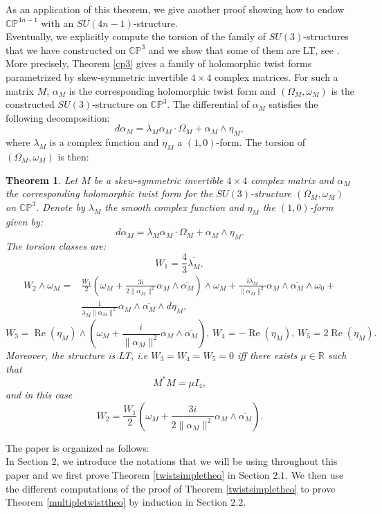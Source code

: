 \documentclass[12pt, reqno]{amsart}
\newtheorem{introthm}{Theorem}
\DeclareMathOperator\Ree{Re}
\newcommand{\R}{\mathbb{R}}
\newcommand{\C}{\mathbb{C}}
\newcommand{\p}{\mathbb{P}}
\begin{document}
As an application of this theorem, we give another proof showing how to endow $\C\p^{4n-1}$ with an $SU(4n-1)$-structure.\\
\indent Eventually, we explicitly compute the torsion of the family of $SU(3)$-structures that we have constructed on $\C\p^3$ and we show that some of them are LT, see \cite{Larfors_2013,Larfors_2010}. More precisely, Theorem \ref{cp3} gives a family of holomorphic twist forms parametrized by skew-symmetric invertible $4\times 4$ complex matrices. For such a matrix $M$, $\alpha_M$ is the corresponding holomorphic twist form and $(\Omega_M,\omega_M)$ is the constructed $SU(3)$-structure on $\C\p^3$. The differential of $\alpha_M$ satisfies the following decomposition: \[d\alpha_M=\lambda_M\alpha_M\cdot\Omega_M+\alpha_M\wedge\eta_M,\] 
where $\lambda_M$ is a complex function and $\eta_M$ a $(1,0)$-form. The torsion of $(\Omega_M,\omega_M)$ is then: 
\begin{introthm}\label{torsion}
    Let $M$ be a skew-symmetric invertible $4\times 4$ complex matrix and $\alpha_M$ the corresponding holomorphic twist form for the $SU(3)$-structure $(\Omega_M,\omega_M)$ on $\C\p^3$. Denote by $\lambda_M$ the smooth complex function and $\eta_M$ the $(1,0)$-form given by: \[d\alpha_M=\lambda_M\alpha_M\cdot\Omega_M+\alpha_M\wedge\eta_M.\] The torsion classes are:
    \[W_1=\frac{4}{3}\overline{\lambda_M},\]
    \begin{align*}W_2\wedge\omega_M=&\frac{W_1}{2}(\omega_M+\frac{3i}{2\|\alpha_M\|^2}\alpha_M\wedge\overline{\alpha_M})\wedge\omega_M+\frac{i\overline{\lambda_M}}{\|\alpha_M\|^2}\alpha_M\wedge\overline{\alpha_M}\wedge\omega_0+\\&\frac{1}{\lambda_M\|\alpha_M\|^2}\alpha_M\wedge\overline{\alpha_M}\wedge d\eta_M,\end{align*} 
    \[W_3=\Ree(\eta_M)\wedge(\omega_M+\frac{i}{\|\alpha_M\|^2}\alpha_M\wedge\overline{\alpha_M}),\, W_4=-\Ree(\eta_M),\, W_5=2\Ree(\eta_M).\] Moreover, the structure is LT, i.e $W_3=W_4=W_5=0$ iff there exists $\mu\in\R$ such that \[M^*M=\mu I_4,\] and in this case \[W_2=\frac{W_1}{2}(\omega_M+\frac{3i}{2\|\alpha_M\|^2}\alpha_M\wedge\overline{\alpha_M}).\] 
\end{introthm}
The paper is organized as follows: \\
\indent In Section $2$, we introduce the notations that we will be using throughout this paper and we first prove Theorem \ref{twistsimpletheo} in Section $2.1$. We then use the different computations of the proof of Theorem \ref{twistsimpletheo} to prove Theorem \ref{multipletwisttheo} by induction in Section $2.2$.\\
\end{document}
